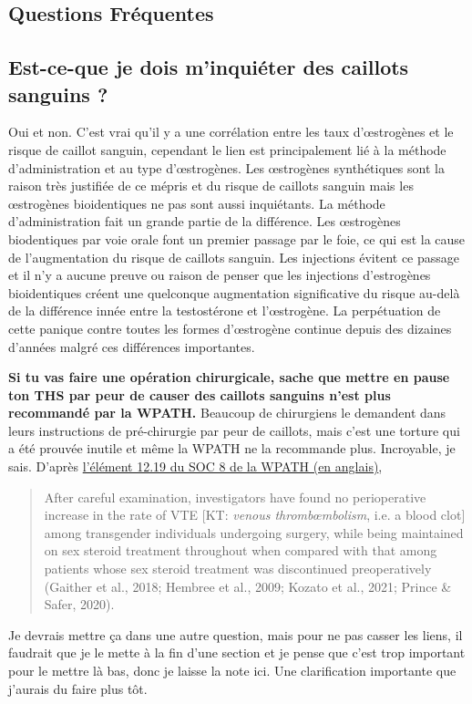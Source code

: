\documentclass{article}
\begin{document}
\subsection*{Questions Fréquentes}

\subsection{Est-ce-que je dois m'inquiéter des caillots sanguins ?}\label{11-1}

Oui et non. C'est vrai qu'il y a une corrélation entre les taux d'œstrogènes et le risque de caillot sanguin, cependant le lien est principalement lié à la méthode d'administration et au type d'œstrogènes. Les œstrogènes synthétiques sont la raison très justifiée de ce mépris et du risque de caillots sanguin mais les œstrogènes bioidentiques ne pas sont aussi inquiétants. La méthode d'administration fait un grande partie de la différence. Les œstrogènes biodentiques par voie orale font un premier passage par le foie, ce qui est la cause de l'augmentation du risque de caillots sanguin. Les injections évitent ce passage et il n'y a aucune preuve ou raison de penser que les injections d'estrogènes bioidentiques créent une quelconque augmentation significative du risque au-delà de la différence innée entre la testostérone et l'œstrogène. La perpétuation de cette panique contre toutes les formes d'œstrogène continue depuis des dizaines d'années malgré ces différences importantes.

\textbf{Si tu vas faire une opération chirurgicale, sache que mettre en pause ton THS par peur de causer des caillots sanguins n'est plus recommandé par la WPATH.} Beaucoup de chirurgiens le demandent dans leurs instructions de pré-chirurgie par peur de caillots, mais c'est une torture qui a été prouvée inutile et même la WPATH ne la recommande plus. Incroyable, je sais. D'après \href{https://www.tandfonline.com/doi/pdf/10.1080/26895269.2022.2100644}{l'élément 12.19 du SOC 8 de la WPATH (en anglais)}, \blockquote{After careful examination, investigators have found no perioperative increase in the rate of VTE [KT: \textit{venous thrombœmbolism}, i.e. a blood clot] among transgender individuals undergoing surgery, while being maintained on sex steroid treatment throughout when compared with that among patients whose sex steroid treatment was discontinued preoperatively (Gaither et al., 2018; Hembree et al., 2009; Kozato et al., 2021; Prince \& Safer, 2020).}. Je devrais mettre ça dans une autre question, mais pour ne pas casser les liens, il faudrait que je le mette à la fin d'une section et je pense que c'est trop important pour le mettre là bas, donc je laisse la note ici. Une clarification importante que j'aurais du faire plus tôt.
\end{document}
